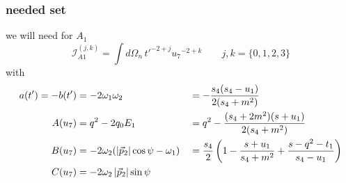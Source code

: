 \subsubsection{needed set}
we will need for $A_1$
\begin{equation}
\mathcal I_{A1}^{(j,k)} = \int\!d\Omega_n\,{t'}^{-2+j} {u_7}^{-2+k} \qquad j,k = \{0,1,2,3\}
\end{equation}
with
\begin{align}
a(t') = -b(t') &= -2\omega_1\omega_2 &&= -\frac{s_4(s_4-u_1)}{2(s_4+m^2)}\\
A(u_7) &= q^2-2q_0E_1 &&= q^2-\frac{(s_4+2m^2)(s+u_1)}{2(s_4+m^2)}\\
B(u_7) &= -2\omega_2(\left|\vec p_2\right|\cos\psi-\omega_1) &&=\frac {s_4}{2}\left(1-\frac{s+u_1}{s_4+m^2}+\frac{s-q^2-t_1}{s_4-u_1}\right)\\
C(u_7) &= -2\omega_2\left|\vec p_2\right|\sin\psi
\end{align}
